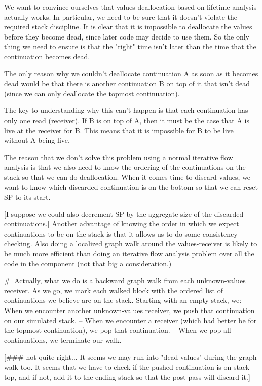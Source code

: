 We want to convince ourselves that values deallocation based on lifetime
analysis actually works.  In particular, we need to be sure that it doesn't
violate the required stack discipline.  It is clear that it is impossible to
deallocate the values before they become dead, since later code may decide to
use them.  So the only thing we need to ensure is that the "right" time isn't
later than the time that the continuation becomes dead.

The only reason why we couldn't deallocate continuation A as soon as it becomes
dead would be that there is another continuation B on top of it that isn't dead
(since we can only deallocate the topmost continuation).

The key to understanding why this can't happen is that each continuation has
only one read (receiver).  If B is on top of A, then it must be the case that A
is live at the receiver for B.  This means that it is impossible for B to be
live without A being live.


The reason that we don't solve this problem using a normal iterative flow
analysis is that we also need to know the ordering of the continuations on the
stack so that we can do deallocation.  When it comes time to discard values, we
want to know which discarded continuation is on the bottom so that we can reset
SP to its start.  

[I suppose we could also decrement SP by the aggregate size of the discarded
continuations.]  Another advantage of knowing the order in which we expect
continuations to be on the stack is that it allows us to do some consistency
checking.  Also doing a localized graph walk around the values-receiver is
likely to be much more efficient than doing an iterative flow analysis problem
over all the code in the component (not that big a consideration.)



\#|
Actually, what we do is a backward graph walk from each unknown-values
receiver.   As we go, we mark each walked block with the ordered list of
continuations we believe are on the stack.  Starting with an empty stack, we:
 -- When we encounter another unknown-values receiver, we push that
    continuation on our simulated stack.
 -- When we encounter a receiver (which had better be for the topmost
    continuation), we pop that continuation.
 -- When we pop all continuations, we terminate our walk.

[\#\#\# not quite right...  It seems we may run into "dead values" during the
graph walk too.  It seems that we have to check if the pushed continuation is
on stack top, and if not, add it to the ending stack so that the post-pass will
discard it.]



